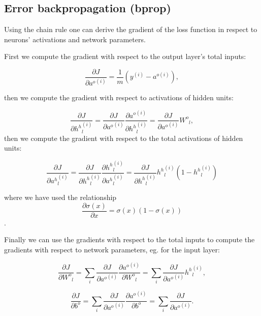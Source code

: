 \documentclass[]{article}
\theoremstyle{definition}
\begin{document}
\subsection{Error backpropagation (bprop)}

Using the chain rule one can derive the gradient of the loss function
in respect to neurons' activations and network parameters.


First we compute the gradient with respect to the output layer's
total inputs:

\begin{equation}
\frac{\partial J}{\partial {a^o}^{(i)}} = \frac{1}{m} \left( y^{(i)}- a^{o{(i)}}  \right),
\end{equation}

then we compute the gradient with respect to activations of hidden units:

\begin{equation}
\frac{\partial J}{\partial {h^h}^{(i)}_l} = \frac{\partial J}{\partial {a^o}^{(i)}} \frac{\partial {a^o}^{(i)}}{\partial {h^h}^{(i)}_l} =  \frac{\partial J}{\partial {a^o}^{(i)}} {W^o}_{l},
\end{equation}
then we compute the gradient with respect to the total activations of hidden units:

\begin{equation}
\frac{\partial J}{\partial {a^h}^{(i)}_l} = \frac{\partial J}{\partial {h^h}^{(i)}_l}\frac{\partial {h^h}^{(i)}_l}{\partial {a^h}^{(i)}_l} = \frac{\partial J}{\partial {h^h}^{(i)}_l} {h^h}^{(i)}_l(1-{h^h}^{(i)}_l) 
\end{equation}

where we have used the relationship
$$\frac{\partial \sigma(x)}{\partial x} = \sigma(x)(1-\sigma(x))$$	.


Finally we can use the gradients with respect to the total inputs to
compute the gradients with respect to network parameters,
eg. for the input layer:

\begin{equation}
\frac{\partial J}{\partial {W^o}_{l}} = \sum_{i}\frac{\partial J}{\partial {a^o}^{(i)}}\frac{\partial {a^o}^{(i)}}{\partial {W^o}_{l}} = \sum_{i}\frac{\partial J}{\partial {a^o}^{(i)}}{h^h}^{(i)}_l,
\end{equation}

\begin{equation}
\frac{\partial J}{\partial {b^o}} = \sum_{i}\frac{\partial J}{\partial {a^o}^{(i)}}\frac{\partial {a^o}^{(i)}}{\partial {b^o}} = \sum_{i}\frac{\partial J}{\partial {a^o}^{(i)}}.
\end{equation}
\end{document}

